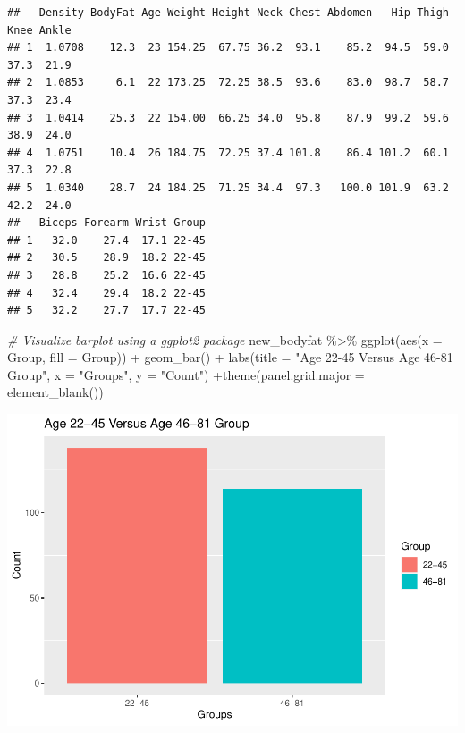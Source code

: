 \documentclass[
]{article}
\newenvironment{Shaded}{\begin{snugshade}}{\end{snugshade}}
\newcommand{\AttributeTok}[1]{\textcolor[rgb]{0.77,0.63,0.00}{#1}}
\newcommand{\CommentTok}[1]{\textcolor[rgb]{0.56,0.35,0.01}{\textit{#1}}}
\newcommand{\FunctionTok}[1]{\textcolor[rgb]{0.00,0.00,0.00}{#1}}
\newcommand{\NormalTok}[1]{#1}
\newcommand{\SpecialCharTok}[1]{\textcolor[rgb]{0.00,0.00,0.00}{#1}}
\newcommand{\StringTok}[1]{\textcolor[rgb]{0.31,0.60,0.02}{#1}}
\begin{document}
\begin{verbatim}
##   Density BodyFat Age Weight Height Neck Chest Abdomen   Hip Thigh Knee Ankle
## 1  1.0708    12.3  23 154.25  67.75 36.2  93.1    85.2  94.5  59.0 37.3  21.9
## 2  1.0853     6.1  22 173.25  72.25 38.5  93.6    83.0  98.7  58.7 37.3  23.4
## 3  1.0414    25.3  22 154.00  66.25 34.0  95.8    87.9  99.2  59.6 38.9  24.0
## 4  1.0751    10.4  26 184.75  72.25 37.4 101.8    86.4 101.2  60.1 37.3  22.8
## 5  1.0340    28.7  24 184.25  71.25 34.4  97.3   100.0 101.9  63.2 42.2  24.0
##   Biceps Forearm Wrist Group
## 1   32.0    27.4  17.1 22-45
## 2   30.5    28.9  18.2 22-45
## 3   28.8    25.2  16.6 22-45
## 4   32.4    29.4  18.2 22-45
## 5   32.2    27.7  17.7 22-45
\end{verbatim}

\begin{Shaded}
\begin{Highlighting}[]
\CommentTok{\# Visualize barplot using a ggplot2 package}
\NormalTok{new\_bodyfat }\SpecialCharTok{\%\textgreater{}\%}
  \FunctionTok{ggplot}\NormalTok{(}\FunctionTok{aes}\NormalTok{(}\AttributeTok{x =}\NormalTok{ Group, }\AttributeTok{fill =}\NormalTok{ Group)) }\SpecialCharTok{+} \FunctionTok{geom\_bar}\NormalTok{() }\SpecialCharTok{+} \FunctionTok{labs}\NormalTok{(}\AttributeTok{title =} \StringTok{"Age 22{-}45 Versus Age 46{-}81 Group"}\NormalTok{, }\AttributeTok{x =} \StringTok{"Groups"}\NormalTok{, }\AttributeTok{y =} \StringTok{"Count"}\NormalTok{) }\SpecialCharTok{+}\FunctionTok{theme}\NormalTok{(}\AttributeTok{panel.grid.major =} \FunctionTok{element\_blank}\NormalTok{())}
\end{Highlighting}
\end{Shaded}

\includegraphics{STAT641_Final_Report_files/figure-latex/unnamed-chunk-21-1.pdf}
\end{document}
